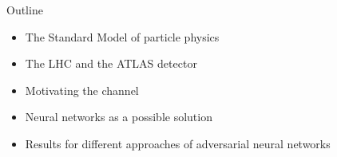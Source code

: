 \begin{frame}{Outline}
\begin{itemize}%
    \item The Standard Model of particle physics
    \vspace{0.5cm}
    \item The LHC and the ATLAS detector
    \vspace{0.5cm}
    \item Motivating the \tW channel
    \vspace{0.5cm}
    \item Neural networks as a possible solution
    \vspace{0.5cm}
    \item Results for different approaches of adversarial neural networks
\end{itemize}
\end{frame}